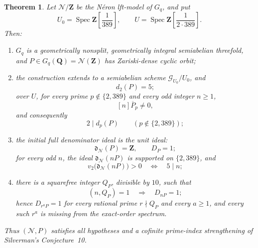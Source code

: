 \documentclass[11pt,letterpaper,reqno]{amsart}
\newtheorem{theorem}{Theorem}[section]
\theoremstyle{definition}
\theoremstyle{remark}
\newcommand{\Q}{\mathbf Q}
\newcommand{\Z}{\mathbf Z}
\newcommand{\Spec}{\operatorname{Spec}}
\newcommand{\dd}{\mathfrak d}
\newcommand{\Ner}{\mathcal N}
\begin{document}
\begin{theorem}
\label{thm:explicit-Q}
Let $\Ner/\Z$ be the N\'eron lft-model of $G_q$, and put
\[
 U_0=\Spec\Z\!\left[\frac1{389}\right],
 \qquad
 U=\Spec\Z\!\left[\frac1{2\cdot389}\right].
\]
Then:
\begin{enumerate}[label=\textup{(\roman*)}]
\item $G_q$ is a geometrically nonsplit, geometrically integral semiabelian
      threefold, and $P\in G_q(\Q)=\Ner(\Z)$ has Zariski-dense cyclic orbit;
\item the construction extends to a semiabelian scheme
      $\mathcal G_{U_0}/U_0$, and
\begin{equation}\label{eq:explicit-order-two}
 d_2(P)=5;
\end{equation}
      over $U$, for every prime $p\notin\{2,389\}$ and every odd integer
      $n\ge1$,
\begin{equation}\label{eq:explicit-odd-obstruction}
 [n]\overline P_p\ne0,
\end{equation}
      and consequently
\begin{equation}\label{eq:explicit-even}
 2\mid d_p(P)\qquad(p\notin\{2,389\});
\end{equation}
\item the initial full denominator ideal is the unit ideal:
\begin{equation}\label{eq:explicit-unit-initial}
 \dd_{\Ner}(P)=\Z,
 \qquad D_P=1;
\end{equation}
      for every odd $n$, the ideal $\dd_{\Ner}(nP)$ is supported on
      $\{2,389\}$, and
\[
 v_2\bigl(\dd_{\Ner}(nP)\bigr)>0
 \quad\Longleftrightarrow\quad 5\mid n;
\]
\item there is a squarefree integer $Q_P$, divisible by $10$, such that
\begin{equation}\label{eq:explicit-coprime-return}
 (n,Q_P)=1\quad\Longrightarrow\quad D_{nP}=1;
\end{equation}
      hence $D_{r^{a}P}=1$ for every rational prime $r\nmid Q_P$ and every
      $a\ge1$, and every such $r^a$ is missing from the exact-order spectrum.
\end{enumerate}
Thus $(\Ner,P)$ satisfies all hypotheses and a cofinite prime-index strengthening of
Silverman's Conjecture~10.
\end{theorem}
\end{document}
